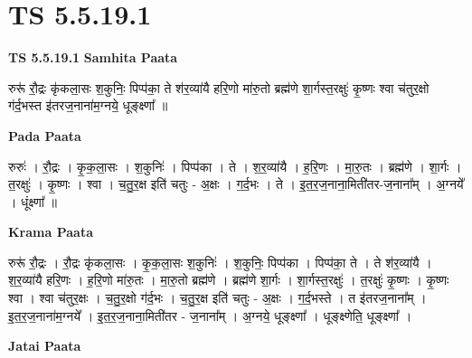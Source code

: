 \documentclass[17pt]{extarticle}
\begin{document}
\section{ TS 5.5.19.1 }

\textbf{TS 5.5.19.1 } \newline
\textbf{Samhita Paata} \newline

रुरू॑ रौ॒द्रः कृ॑कला॒सः श॒कुनिः॒ पिप्प॑का॒ ते श॑र॒व्या॑यै हरि॒णो मा॑रु॒तो ब्रह्म॑णे शा॒र्गस्त॒रक्षुः॑ कृ॒ष्णः श्वा च॑तुर॒क्षो ग॑र्द॒भस्त इ॑तरज॒नाना॑म॒ग्नये॒ धूङ्क्ष्णा᳚ ॥ \newline

\textbf{Pada Paata} \newline

रुरुः॑ । रौ॒द्रः । कृ॒क॒ला॒सः । श॒कुनिः॑ । पिप्प॑का । ते । श॒र॒व्या॑यै । ह॒रि॒णः । मा॒रु॒तः । ब्रह्म॑णे । शा॒र्गः । त॒रक्षुः॑ । कृ॒ष्णः । श्वा । च॒तु॒र॒क्ष इति॑ चतुः - अ॒क्षः । ग॒र्द॒भः । ते । इ॒त॒र॒ज॒नाना॒मिती॑तर-ज॒नाना᳚म् । अ॒ग्नये᳚ । धूंक्ष्णा᳚ ॥  \newline


\textbf{Krama Paata} \newline

रुरू॑ रौ॒द्रः । रौ॒द्रः कृ॑कला॒सः । कृ॒क॒ला॒सः श॒कुनिः॑ । श॒कुनिः॒ पिप्प॑का । पिप्प॑का॒ ते । ते श॑र॒व्या॑यै । श॒र॒व्या॑यै हरि॒णः । ह॒रि॒णो मा॑रु॒तः । मा॒रु॒तो ब्रह्म॑णे । ब्रह्म॑णे शा॒र्गः । शा॒र्गस्त॒रक्षुः॑ । त॒रक्षुः॑ कृ॒ष्णः । कृ॒ष्णः श्वा । श्वा च॑तुर॒क्षः । च॒तु॒र॒क्षो ग॑र्द॒भः । च॒तु॒र॒क्ष इति॑ चतुः - अ॒क्षः । ग॒र्द॒भस्ते । त इ॑तरज॒नाना᳚म् । इ॒त॒र॒ज॒नाना॑म॒ग्नये᳚ । इ॒त॒र॒ज॒नाना॒मिती॑तर - ज॒नाना᳚म् । अ॒ग्नये॒ धूङ्क्ष्णा᳚ । धूङ्क्ष्णेति॒ धूङ्क्ष्णा᳚ । \newline

\textbf{Jatai Paata} \newline
\end{document}
